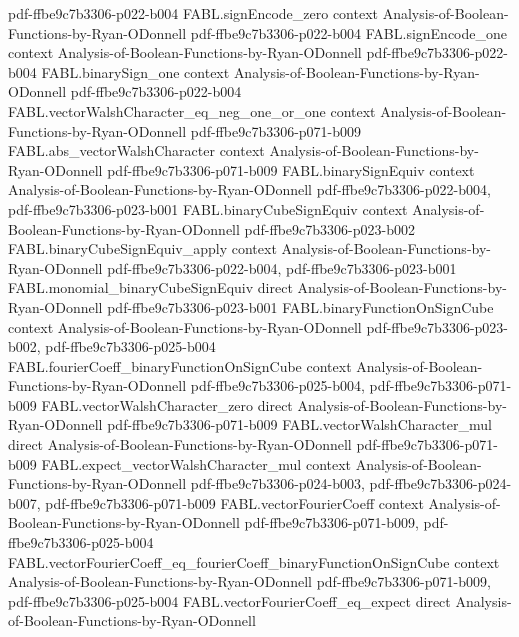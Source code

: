 \begin{theorem}
  {pdf-ffbe9c7b3306-p022-b004}
\proofstep
  {FABL.signEncode_zero}
  {context}
  {Analysis-of-Boolean-Functions-by-Ryan-ODonnell}
  {pdf-ffbe9c7b3306-p022-b004}
\proofstep
  {FABL.signEncode_one}
  {context}
  {Analysis-of-Boolean-Functions-by-Ryan-ODonnell}
  {pdf-ffbe9c7b3306-p022-b004}
\proofstep
  {FABL.binarySign_one}
  {context}
  {Analysis-of-Boolean-Functions-by-Ryan-ODonnell}
  {pdf-ffbe9c7b3306-p022-b004}
\proofstep
  {FABL.vectorWalshCharacter_eq_neg_one_or_one}
  {context}
  {Analysis-of-Boolean-Functions-by-Ryan-ODonnell}
  {pdf-ffbe9c7b3306-p071-b009}
\proofstep
  {FABL.abs_vectorWalshCharacter}
  {context}
  {Analysis-of-Boolean-Functions-by-Ryan-ODonnell}
  {pdf-ffbe9c7b3306-p071-b009}
\proofstep
  {FABL.binarySignEquiv}
  {context}
  {Analysis-of-Boolean-Functions-by-Ryan-ODonnell}
  {pdf-ffbe9c7b3306-p022-b004,
    pdf-ffbe9c7b3306-p023-b001}
\proofstep
  {FABL.binaryCubeSignEquiv}
  {context}
  {Analysis-of-Boolean-Functions-by-Ryan-ODonnell}
  {pdf-ffbe9c7b3306-p023-b002}
\proofstep
  {FABL.binaryCubeSignEquiv_apply}
  {context}
  {Analysis-of-Boolean-Functions-by-Ryan-ODonnell}
  {pdf-ffbe9c7b3306-p022-b004,
    pdf-ffbe9c7b3306-p023-b001}
\proofstep
  {FABL.monomial_binaryCubeSignEquiv}
  {direct}
  {Analysis-of-Boolean-Functions-by-Ryan-ODonnell}
  {pdf-ffbe9c7b3306-p023-b001}
\proofstep
  {FABL.binaryFunctionOnSignCube}
  {context}
  {Analysis-of-Boolean-Functions-by-Ryan-ODonnell}
  {pdf-ffbe9c7b3306-p023-b002,
    pdf-ffbe9c7b3306-p025-b004}
\proofstep
  {FABL.fourierCoeff_binaryFunctionOnSignCube}
  {context}
  {Analysis-of-Boolean-Functions-by-Ryan-ODonnell}
  {pdf-ffbe9c7b3306-p025-b004,
    pdf-ffbe9c7b3306-p071-b009}
\proofstep
  {FABL.vectorWalshCharacter_zero}
  {direct}
  {Analysis-of-Boolean-Functions-by-Ryan-ODonnell}
  {pdf-ffbe9c7b3306-p071-b009}
\proofstep
  {FABL.vectorWalshCharacter_mul}
  {direct}
  {Analysis-of-Boolean-Functions-by-Ryan-ODonnell}
  {pdf-ffbe9c7b3306-p071-b009}
\proofstep
  {FABL.expect_vectorWalshCharacter_mul}
  {context}
  {Analysis-of-Boolean-Functions-by-Ryan-ODonnell}
  {pdf-ffbe9c7b3306-p024-b003,
    pdf-ffbe9c7b3306-p024-b007,
    pdf-ffbe9c7b3306-p071-b009}
\proofstep
  {FABL.vectorFourierCoeff}
  {context}
  {Analysis-of-Boolean-Functions-by-Ryan-ODonnell}
  {pdf-ffbe9c7b3306-p071-b009,
    pdf-ffbe9c7b3306-p025-b004}
\proofstep
  {FABL.vectorFourierCoeff_eq_fourierCoeff_binaryFunctionOnSignCube}
  {context}
  {Analysis-of-Boolean-Functions-by-Ryan-ODonnell}
  {pdf-ffbe9c7b3306-p071-b009,
    pdf-ffbe9c7b3306-p025-b004}
\proofstep
  {FABL.vectorFourierCoeff_eq_expect}
  {direct}
  {Analysis-of-Boolean-Functions-by-Ryan-ODonnell}

\end{theorem}
